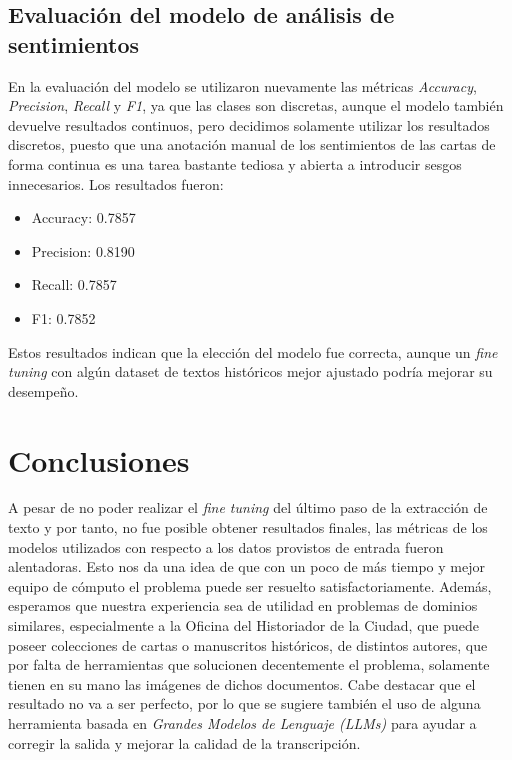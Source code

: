 \documentclass[11pt,a4paper]{article}
\begin{document}
\subsection{Evaluación del modelo de análisis de sentimientos}
En la evaluación del modelo se utilizaron nuevamente las métricas \textit{Accuracy}, \textit{Precision}, \textit{Recall} y \textit{F1}, ya que las clases son discretas, aunque el modelo también devuelve resultados continuos, pero decidimos solamente utilizar los resultados discretos, puesto que una anotación manual de los sentimientos de las cartas de forma continua es una tarea bastante tediosa y abierta a introducir sesgos innecesarios. 
Los resultados fueron:

\begin{itemize}
    \item Accuracy: 0.7857
    \item Precision: 0.8190
    \item Recall: 0.7857
    \item F1: 0.7852
\end{itemize}

Estos resultados indican que la elección del modelo fue correcta, aunque un \textit{fine tuning} con algún dataset de textos históricos mejor ajustado podría mejorar su desempeño.

\section{Conclusiones}
A pesar de no poder realizar el \textit{fine tuning} del último paso de la extracción de texto y por tanto, no fue posible obtener resultados finales, las métricas de los modelos utilizados con respecto a los datos provistos de entrada fueron alentadoras. 
Esto nos da una idea de que con un poco de más tiempo y mejor equipo de cómputo el problema puede ser resuelto satisfactoriamente. 
Además, esperamos que nuestra experiencia sea de utilidad en problemas de dominios similares, especialmente a la Oficina del Historiador de la Ciudad, que puede poseer colecciones de cartas o manuscritos históricos, de distintos autores, que por falta de herramientas que solucionen decentemente el problema, solamente tienen en su mano las imágenes de dichos documentos. 
Cabe destacar que el resultado no va a ser perfecto, por lo que se sugiere también el uso de alguna herramienta basada en \textit{Grandes Modelos de Lenguaje (LLMs)} para ayudar a corregir la salida y mejorar la calidad de la transcripción.
\end{document}
